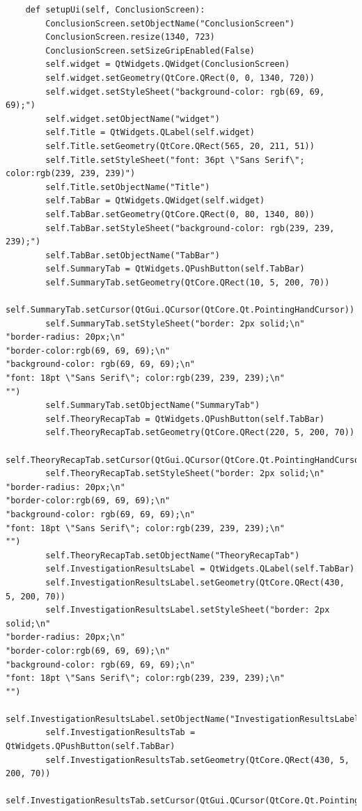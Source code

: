 \documentclass[12pt]{article}
\begin{document}
\begin{lstlisting}
    def setupUi(self, ConclusionScreen):
        ConclusionScreen.setObjectName("ConclusionScreen")
        ConclusionScreen.resize(1340, 723)
        ConclusionScreen.setSizeGripEnabled(False)
        self.widget = QtWidgets.QWidget(ConclusionScreen)
        self.widget.setGeometry(QtCore.QRect(0, 0, 1340, 720))
        self.widget.setStyleSheet("background-color: rgb(69, 69, 69);")
        self.widget.setObjectName("widget")
        self.Title = QtWidgets.QLabel(self.widget)
        self.Title.setGeometry(QtCore.QRect(565, 20, 211, 51))
        self.Title.setStyleSheet("font: 36pt \"Sans Serif\"; color:rgb(239, 239, 239)")
        self.Title.setObjectName("Title")
        self.TabBar = QtWidgets.QWidget(self.widget)
        self.TabBar.setGeometry(QtCore.QRect(0, 80, 1340, 80))
        self.TabBar.setStyleSheet("background-color: rgb(239, 239, 239);")
        self.TabBar.setObjectName("TabBar")
        self.SummaryTab = QtWidgets.QPushButton(self.TabBar)
        self.SummaryTab.setGeometry(QtCore.QRect(10, 5, 200, 70))
        self.SummaryTab.setCursor(QtGui.QCursor(QtCore.Qt.PointingHandCursor))
        self.SummaryTab.setStyleSheet("border: 2px solid;\n"
"border-radius: 20px;\n"
"border-color:rgb(69, 69, 69);\n"
"background-color: rgb(69, 69, 69);\n"
"font: 18pt \"Sans Serif\"; color:rgb(239, 239, 239);\n"
"")
        self.SummaryTab.setObjectName("SummaryTab")
        self.TheoryRecapTab = QtWidgets.QPushButton(self.TabBar)
        self.TheoryRecapTab.setGeometry(QtCore.QRect(220, 5, 200, 70))
        self.TheoryRecapTab.setCursor(QtGui.QCursor(QtCore.Qt.PointingHandCursor))
        self.TheoryRecapTab.setStyleSheet("border: 2px solid;\n"
"border-radius: 20px;\n"
"border-color:rgb(69, 69, 69);\n"
"background-color: rgb(69, 69, 69);\n"
"font: 18pt \"Sans Serif\"; color:rgb(239, 239, 239);\n"
"")
        self.TheoryRecapTab.setObjectName("TheoryRecapTab")
        self.InvestigationResultsLabel = QtWidgets.QLabel(self.TabBar)
        self.InvestigationResultsLabel.setGeometry(QtCore.QRect(430, 5, 200, 70))
        self.InvestigationResultsLabel.setStyleSheet("border: 2px solid;\n"
"border-radius: 20px;\n"
"border-color:rgb(69, 69, 69);\n"
"background-color: rgb(69, 69, 69);\n"
"font: 18pt \"Sans Serif\"; color:rgb(239, 239, 239);\n"
"")
        self.InvestigationResultsLabel.setObjectName("InvestigationResultsLabel")
        self.InvestigationResultsTab = QtWidgets.QPushButton(self.TabBar)
        self.InvestigationResultsTab.setGeometry(QtCore.QRect(430, 5, 200, 70))
        self.InvestigationResultsTab.setCursor(QtGui.QCursor(QtCore.Qt.PointingHandCursor))

\end{lstlisting}
\end{document}
